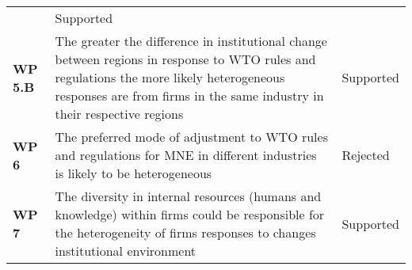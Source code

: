 \begin{table}
\begin{tabular}{p{2.06cm}p{9.5cm}p{1.8cm}}
                                                     & Supported                \\
\textbf{WP 5.B}  &%
    The greater the difference in institutional change between regions in response to WTO rules and regulations the more likely heterogeneous responses are from firms in the same industry in their respective regions  
                                                    & Supported             \\
\textbf{WP 6}  &%
    The preferred mode of adjustment to WTO rules and regulations for MNE in different industries is likely to be heterogeneous     
                                                    & Rejected                      \\
\textbf{WP 7}  &%
    The diversity in internal resources (humans and knowledge) within firms could be responsible for the heterogeneity of firms responses to changes institutional environment                                    
                                                     & Supported              \\
 \bottomrule                                                                                                                                                                                                                                                   
    \end{tabular}
\end{table}